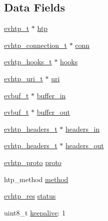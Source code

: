 \subsection*{Data Fields}
\begin{DoxyCompactItemize}
\item 
\hyperlink{evhtp_8h_aa670c92d77f9a732e03a7d48ada2b31b}{evhtp\-\_\-t} $\ast$ \hyperlink{structevhtp__request__s_ad2f5cc5c9e97f75f1fe923c57af9e875}{htp}
\item 
\hyperlink{evhtp_8h_aa51ddee7192d35f0f586d85d7e555891}{evhtp\-\_\-connection\-\_\-t} $\ast$ \hyperlink{structevhtp__request__s_a313e4d80c47517f02f2fe99e8840c280}{conn}
\item 
\hyperlink{evhtp_8h_ac77d779459ec62f309d1fb09c5540786}{evhtp\-\_\-hooks\-\_\-t} $\ast$ \hyperlink{structevhtp__request__s_ac97663394f74c9030e57c771cfb7981e}{hooks}
\item 
\hyperlink{evhtp_8h_a5057cdb41a47631dd5672cbc1b59bcf8}{evhtp\-\_\-uri\-\_\-t} $\ast$ \hyperlink{structevhtp__request__s_adfdac9f1ecf15761c62699a52d855a49}{uri}
\item 
\hyperlink{evhtp_8h_a7c30b85cd8bba6ebbfe58c3fc81139c8}{evbuf\-\_\-t} $\ast$ \hyperlink{structevhtp__request__s_ad9e8b203574b6c44296b23b897206768}{buffer\-\_\-in}
\item 
\hyperlink{evhtp_8h_a7c30b85cd8bba6ebbfe58c3fc81139c8}{evbuf\-\_\-t} $\ast$ \hyperlink{structevhtp__request__s_aa2a97cf41f1776b60c84e31eb6778d05}{buffer\-\_\-out}
\item 
\hyperlink{evhtp_8h_a39e4a3adac2cba0714b1f6c77311f868}{evhtp\-\_\-headers\-\_\-t} $\ast$ \hyperlink{structevhtp__request__s_a231fb5c9d95add6d73b4500233a98de8}{headers\-\_\-in}
\item 
\hyperlink{evhtp_8h_a39e4a3adac2cba0714b1f6c77311f868}{evhtp\-\_\-headers\-\_\-t} $\ast$ \hyperlink{structevhtp__request__s_a139e220680f914ac7a44f3dac1b34be0}{headers\-\_\-out}
\item 
\hyperlink{evhtp_8h_ac3df0cb2556f57ad0bc8bb44ae126da5}{evhtp\-\_\-proto} \hyperlink{structevhtp__request__s_a3acae974abf6e95063cab796fbe2a7f6}{proto}
\item 
htp\-\_\-method \hyperlink{structevhtp__request__s_a5322aefd6f774a31c7cbfaeee0d3a417}{method}
\item 
\hyperlink{evhtp_8h_ac6ada2a29bcb7a7ddcfdcabc0d37022a}{evhtp\-\_\-res} \hyperlink{structevhtp__request__s_a9342eb644f9122b975cf9e2aed3cc00c}{status}
\item 
uint8\-\_\-t \hyperlink{structevhtp__request__s_aba0b971f0932db8772a9091c0da49728}{keepalive}\-: 1

\end{DoxyCompactItemize}
